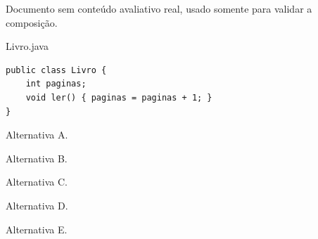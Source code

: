 \documentclass[11pt,a4paper]{article}
\begin{document}
\cabecalhoAvaliacao
\begin{quadroRespostas}
\end{quadroRespostas}
Documento sem conteúdo avaliativo real, usado somente para validar a composição.
\begin{painelreferencia}{Livro.java}
\begin{lstlisting}[style=cenariocodigo]
public class Livro {
    int paginas;
    void ler() { paginas = paginas + 1; }
}
\end{lstlisting}
\end{painelreferencia}
\inicioQuestoes
{}
\newpage
{}
\begin{alternativas}
\item Alternativa A. \item Alternativa B. \item Alternativa C.
\item Alternativa D. \item Alternativa E.
\end{alternativas}
\end{document}

